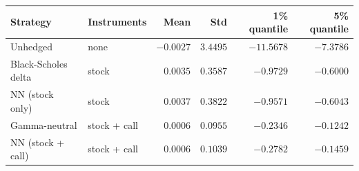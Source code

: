 \begin{tabular}{llrrrr}
\toprule
Strategy & Instruments & Mean & Std & 1\% quantile & 5\% quantile \\
\midrule
Unhedged & none & $-0.0027$ & $3.4495$ & $-11.5678$ & $-7.3786$ \\
Black-Scholes delta & stock & $0.0035$ & $0.3587$ & $-0.9729$ & $-0.6000$ \\
NN (stock only) & stock & $0.0037$ & $0.3822$ & $-0.9571$ & $-0.6043$ \\
Gamma-neutral & stock + call & $0.0006$ & $0.0955$ & $-0.2346$ & $-0.1242$ \\
NN (stock + call) & stock + call & $0.0006$ & $0.1039$ & $-0.2782$ & $-0.1459$ \\
\bottomrule
\end{tabular}

